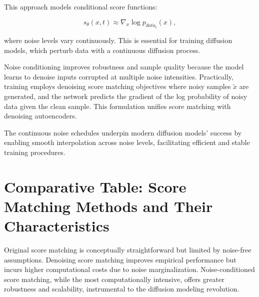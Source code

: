 This approach models conditional score functions:

\[
s_\theta(x, t) \approx \nabla_x \log p_{data_t}(x),
\]

where noise levels vary continuously. This is essential for training diffusion models, which perturb data with a continuous diffusion process.

Noise conditioning improves robustness and sample quality because the model learns to denoise inputs corrupted at multiple noise intensities. Practically, training employs denoising score matching objectives where noisy samples \( \tilde{x} \) are generated, and the network predicts the gradient of the log probability of noisy data given the clean sample. This formulation unifies score matching with denoising autoencoders.

The continuous noise schedules underpin modern diffusion models' success by enabling smooth interpolation across noise levels, facilitating efficient and stable training procedures.

\section{Comparative Table: Score Matching Methods and Their Characteristics}

\begin{table}[h]
\centering
{}
\caption{Comparison of Score Matching Approaches}
\end{table}

Original score matching is conceptually straightforward but limited by noise-free assumptions. Denoising score matching improves empirical performance but incurs higher computational costs due to noise marginalization. Noise-conditioned score matching, while the most computationally intensive, offers greater robustness and scalability, instrumental to the diffusion modeling revolution.

